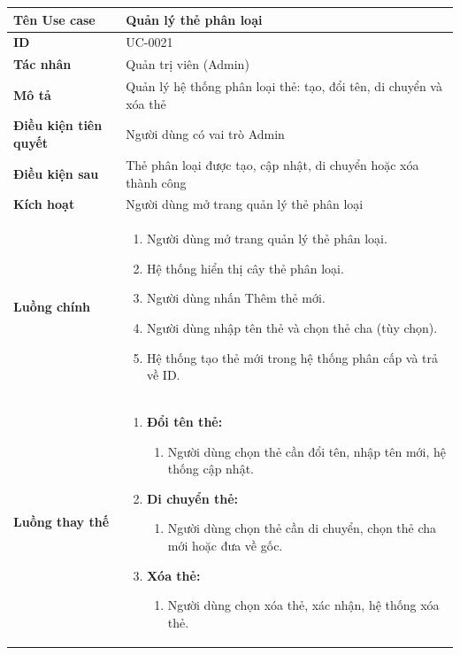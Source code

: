 {
\small
\renewcommand{\arraystretch}{1.15}

\begin{tabularx}{\textwidth}{|>{\raggedright\arraybackslash}p{3.5cm}|>{\raggedright\arraybackslash}X|}
\hline
\textbf{Tên Use case} & Quản lý thẻ phân loại \\
\hline
\textbf{ID} & UC-0021 \\
\hline
\textbf{Tác nhân} & Quản trị viên (Admin) \\
\hline
\textbf{Mô tả} & Quản lý hệ thống phân loại thẻ: tạo, đổi tên, di chuyển và xóa thẻ \\
\hline
\textbf{Điều kiện tiên quyết} & Người dùng có vai trò Admin \\
\hline
\textbf{Điều kiện sau} & Thẻ phân loại được tạo, cập nhật, di chuyển hoặc xóa thành công \\
\hline
\textbf{Kích hoạt} & Người dùng mở trang quản lý thẻ phân loại \\
\hline
\textbf{Luồng chính} &
\begin{enumerate}
    \item Người dùng mở trang quản lý thẻ phân loại.
    \item Hệ thống hiển thị cây thẻ phân loại.
    \item Người dùng nhấn Thêm thẻ mới.
    \item Người dùng nhập tên thẻ và chọn thẻ cha (tùy chọn).
    \item Hệ thống tạo thẻ mới trong hệ thống phân cấp và trả về ID.
\end{enumerate} \\
\hline
\textbf{Luồng thay thế} &
\begin{enumerate}
    \item \textbf{Đổi tên thẻ:}
    \begin{enumerate}
        \item[3A.] Người dùng chọn thẻ cần đổi tên, nhập tên mới, hệ thống cập nhật.
    \end{enumerate}
    \item \textbf{Di chuyển thẻ:}
    \begin{enumerate}
        \item[3B.] Người dùng chọn thẻ cần di chuyển, chọn thẻ cha mới hoặc đưa về gốc.
    \end{enumerate}
    \item \textbf{Xóa thẻ:}
    \begin{enumerate}
        \item[3C.] Người dùng chọn xóa thẻ, xác nhận, hệ thống xóa thẻ.

\end{enumerate}
\end{enumerate}
\end{tabularx}}
